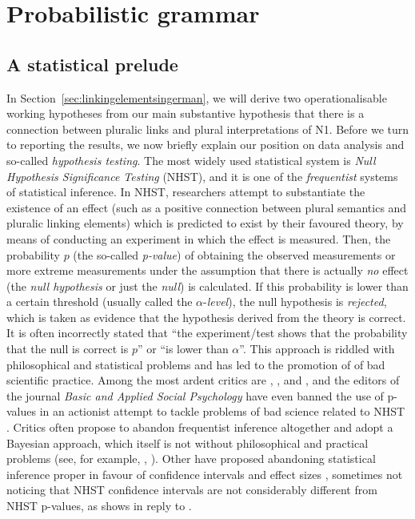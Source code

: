 \section{Probabilistic grammar}
\label{sec:probabilisticgrammar}


\subsection{A statistical prelude}
\label{ssub:astatisticalprelude}

In Section~\ref{sec:linkingelementsingerman}, we will derive two operationalisable working hypotheses from our main substantive hypothesis that there is a connection between pluralic links and plural interpretations of N1.
Before we turn to reporting the results, we now briefly explain our position on data analysis and so-called \textit{hypothesis testing}.
The most widely used statistical system is \textit{Null Hypothesis Significance Testing} (NHST), and it is one of the \textit{frequentist} systems of statistical inference.
In NHST, researchers attempt to substantiate the existence of an effect (such as a positive connection between plural semantics and pluralic linking elements) which is predicted to exist by their favoured theory, by means of conducting an experiment in which the effect is measured.
Then, the probability $p$ (the so-called \textit{p-value}) of obtaining the observed measurements or more extreme measurements under the assumption that there is actually \textit{no} effect (the \textit{null hypothesis} or just the \textit{null}) is calculated.
If this probability is lower than a certain threshold (usually called the $\alpha$-\textit{level}), the null hypothesis is \textit{rejected}, which is taken as evidence that the hypothesis derived from the theory is correct.
It is often incorrectly stated that ``the experiment\slash test shows that the probability that the null is correct is $p$'' or ``is lower than $\alpha$''.
This approach is riddled with philosophical and statistical problems and has led to the promotion of of bad scientific practice.
Among the most ardent critics are \textcite{Gigerenzer2004}, \textcite{Colquhoun2014}, and \textcite{MunafoEa2017}, and the editors of the journal \textit{Basic and Applied Social Psychology} have even banned the use of p-values in an actionist attempt to tackle problems of bad science related to NHST \parencite{TrafimowMarks2016}.
Critics often propose to abandon frequentist inference altogether and adopt a Bayesian approach, which itself is not without philosophical and practical problems (see, for example, \citealt{Mayo1996}, \citealt{Senn2011}).
Other have proposed abandoning statistical inference proper in favour of confidence intervals and effect sizes \parencite{Cumming2014}, sometimes not noticing that NHST confidence intervals are not considerably different from NHST p-values, as \textcite{Perezgonzalez2015b} shows in reply to \textcite{Cumming2014}.

